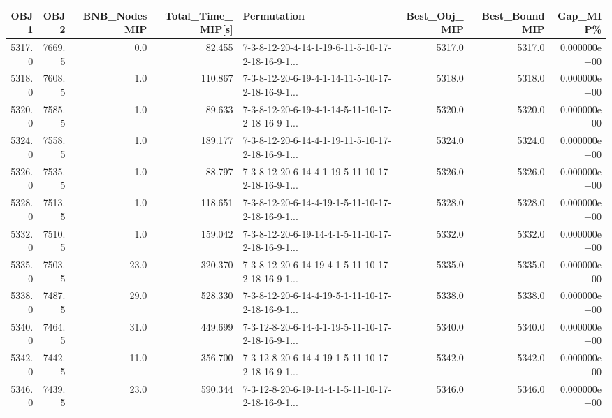 \begin{tabular}{rrrrlrrr}
\toprule
   OBJ1 &    OBJ2 &  BNB\_Nodes\_MIP &  Total\_Time\_MIP[s] &                                        Permutation &  Best\_Obj\_MIP &  Best\_Bound\_MIP &      Gap\_MIP\% \\
\midrule
 5317.0 &  7669.5 &            0.0 &             82.455 &  7-3-8-12-20-4-14-1-19-6-11-5-10-17-2-18-16-9-1... &        5317.0 &          5317.0 &  0.000000e+00 \\
 5318.0 &  7608.5 &            1.0 &            110.867 &  7-3-8-12-20-6-19-4-1-14-11-5-10-17-2-18-16-9-1... &        5318.0 &          5318.0 &  0.000000e+00 \\
 5320.0 &  7585.5 &            1.0 &             89.633 &  7-3-8-12-20-6-19-4-1-14-5-11-10-17-2-18-16-9-1... &        5320.0 &          5320.0 &  0.000000e+00 \\
 5324.0 &  7558.5 &            1.0 &            189.177 &  7-3-8-12-20-6-14-4-1-19-11-5-10-17-2-18-16-9-1... &        5324.0 &          5324.0 &  0.000000e+00 \\
 5326.0 &  7535.5 &            1.0 &             88.797 &  7-3-8-12-20-6-14-4-1-19-5-11-10-17-2-18-16-9-1... &        5326.0 &          5326.0 &  0.000000e+00 \\
 5328.0 &  7513.5 &            1.0 &            118.651 &  7-3-8-12-20-6-14-4-19-1-5-11-10-17-2-18-16-9-1... &        5328.0 &          5328.0 &  0.000000e+00 \\
 5332.0 &  7510.5 &            1.0 &            159.042 &  7-3-8-12-20-6-19-14-4-1-5-11-10-17-2-18-16-9-1... &        5332.0 &          5332.0 &  0.000000e+00 \\
 5335.0 &  7503.5 &           23.0 &            320.370 &  7-3-8-12-20-6-14-19-4-1-5-11-10-17-2-18-16-9-1... &        5335.0 &          5335.0 &  0.000000e+00 \\
 5338.0 &  7487.5 &           29.0 &            528.330 &  7-3-8-12-20-6-14-4-19-5-1-11-10-17-2-18-16-9-1... &        5338.0 &          5338.0 &  0.000000e+00 \\
 5340.0 &  7464.5 &           31.0 &            449.699 &  7-3-12-8-20-6-14-4-1-19-5-11-10-17-2-18-16-9-1... &        5340.0 &          5340.0 &  0.000000e+00 \\
 5342.0 &  7442.5 &           11.0 &            356.700 &  7-3-12-8-20-6-14-4-19-1-5-11-10-17-2-18-16-9-1... &        5342.0 &          5342.0 &  0.000000e+00 \\
 5346.0 &  7439.5 &           23.0 &            590.344 &  7-3-12-8-20-6-19-14-4-1-5-11-10-17-2-18-16-9-1... &        5346.0 &          5346.0 &  0.000000e+00 \\

\end{tabular}
